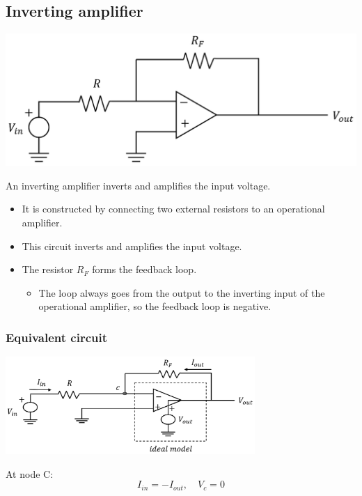 \documentclass[11pt]{article}
\begin{document}
\subsection{Inverting amplifier}
\label{sec:orgbdc6819}
\begin{center}
\includegraphics[width=.9\linewidth]{./images/inverting-amplifier-diagram.png}
\end{center}

An inverting amplifier inverts and amplifies the input voltage.
\begin{itemize}
\item It is constructed by connecting two external resistors to an operational amplifier.
\item This circuit inverts and amplifies the input voltage.
\item The resistor \(R_F\) forms the feedback loop.
\begin{itemize}
\item The loop always goes from the output to the inverting input of the operational amplifier, so the feedback loop is negative.
\end{itemize}
\end{itemize}

 \newpage
\subsubsection{Equivalent circuit}
\label{sec:org42e89ec}
\begin{center}
\includegraphics[height=10em]{./images/inverting-amplifier-circuit.png}
\end{center}

At node C:
\[I_{in} = - I_{out}, \quad V_c = 0\]
\end{document}
